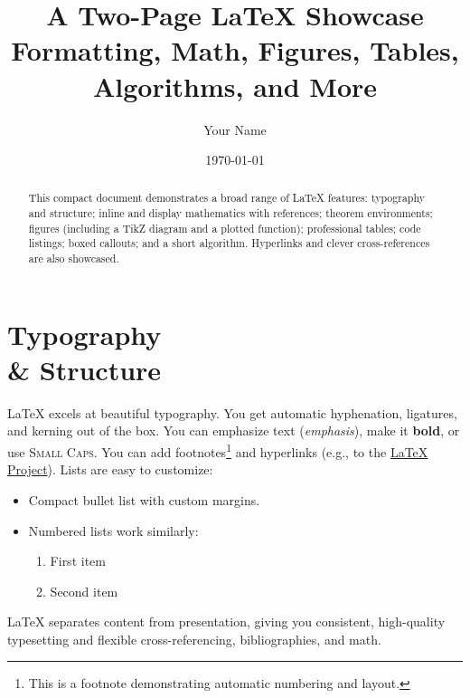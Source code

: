 \documentclass[11pt]{article}
\title{A Two-Page LaTeX Showcase\\\large Formatting, Math, Figures, Tables, Algorithms, and More}
\author{Your Name}
\date{\today}
\begin{document}
\maketitle
\begin{abstract}
This compact document demonstrates a broad range of \LaTeX{} features: typography and structure; inline and display mathematics with references; theorem environments; figures (including a TikZ diagram and a plotted function); professional tables; code listings; boxed callouts; and a short algorithm. Hyperlinks and clever cross-references are also showcased.
\end{abstract}

\section{Typography \\ \& Structure}
\LaTeX{} excels at beautiful typography. You get automatic hyphenation, ligatures, and kerning out of the box. You can emphasize text (\emph{emphasis}), make it \textbf{bold}, or use \textsc{Small Caps}. You can add footnotes\footnote{This is a footnote demonstrating automatic numbering and layout.} and hyperlinks (e.g., to the \href{https://www.latex-project.org}{\LaTeX{} Project}). Lists are easy to customize:
\begin{itemize}[leftmargin=1.5em]
  \item Compact bullet list with custom margins.
  \item Numbered lists work similarly:
    \begin{enumerate}[label=\arabic*.]
      \item First item
      \item Second item
    \end{enumerate}
\end{itemize}
\begin{tcolorbox}[title=Callout: Why \LaTeX?,colback=blue!3!white,colframe=MidnightBlue,enhanced,breakable]
\LaTeX{} separates content from presentation, giving you consistent, high-quality typesetting and flexible cross-referencing, bibliographies, and math.
\end{tcolorbox}
\end{document}
